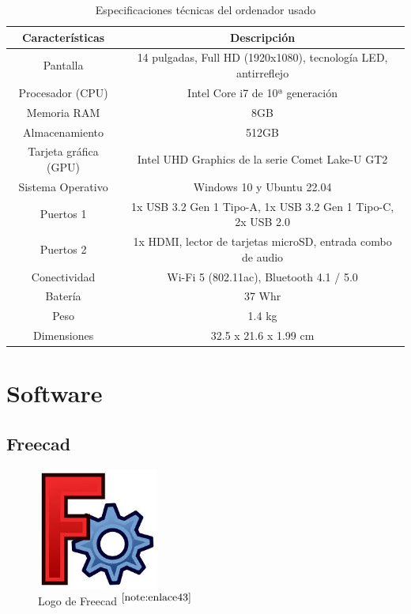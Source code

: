 \setcounter{footnote}{42} %

\begin{table}[H]
	\begin{center}
		\begin{tabular}{|c|c|}
			\hline
			\textbf{Características} & \textbf{Descripción} \\
			\hline
			Pantalla & 14 pulgadas, Full HD (1920x1080), tecnología LED, antirreflejo \\
			Procesador (CPU) & Intel Core i7 de 10ª generación \\
			Memoria RAM & 8GB \\
			Almacenamiento & 512GB \\
			Tarjeta gráfica (GPU) & Intel UHD Graphics de la serie Comet Lake-U GT2 \\
			Sistema Operativo & Windows 10 y Ubuntu 22.04 \\
			Puertos 1 & 1x USB 3.2 Gen 1 Tipo-A, 1x USB 3.2 Gen 1 Tipo-C, 2x USB 2.0\\  
			Puertos 2 & 1x HDMI, lector de tarjetas microSD, entrada combo de audio \\
			Conectividad & 	Wi-Fi 5 (802.11ac), Bluetooth 4.1 / 5.0 \\
			Batería & 37 Whr \\
			Peso & 1.4 kg \\
			Dimensiones & 32.5 x 21.6 x 1.99 cm \\
			\hline
		\end{tabular}
		\caption{Especificaciones técnicas del ordenador usado}
		\label{cuadro:carac_ordena}
	\end{center}
\end{table}


\section{Software}

\subsection{Freecad}

\begin{figure} [h!]
	\begin{center}
		\includegraphics[width=4cm]{figs/freecad.png}
	\end{center}
	\caption{Logo de Freecad $^{\ref{note:enlace43}}$} 
	\label{fig:freecad}
\end{figure}\

